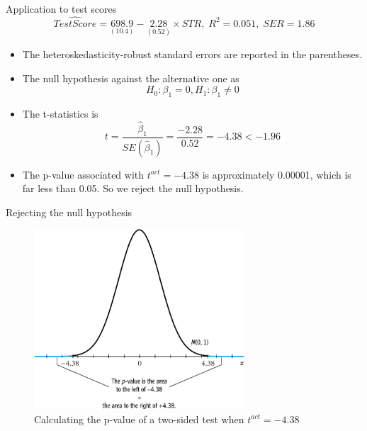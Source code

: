 \documentclass[presentation]{beamer}
\begin{document}
\begin{frame}[label={sec:org210bcff}]{Application to test scores}
\begin{equation*}
\widehat{TestScore} = \underset{\displaystyle (10.4)}{698.9} - \underset{\displaystyle (0.52)}{2.28} \times STR,\; R^2 = 0.051,\; SER = 1.86
\end{equation*}

\begin{itemize}
\item The \alert{heteroskedasticity-robust} standard errors are reported in the
parentheses.

\item The null hypothesis against the alternative one as
\[ H_0: \beta_1 = 0, H_1: \beta_1 \neq 0 \]

\item The t-statistics is
\[ t = \frac{\hat{\beta}_1}{SE(\hat{\beta}_1)} = \frac{-2.28}{0.52}
  = -4.38 < -1.96 \]

\item The p-value associated with \(t^{act} = -4.38\) is approximately
0.00001, which is far less than 0.05. So we reject the null
hypothesis.
\end{itemize}
\end{frame}

\begin{frame}[label={sec:org2299bf5}]{Rejecting the null hypothesis}
\begin{figure}[htbp]
\centering
\includegraphics[width=0.7\textwidth]{figure/fig-5-1.png}
\caption{\label{fig:org0cec173}
Calculating the p-value of a two-sided test when \(t^{act}=-4.38\)}
\end{figure}
\end{frame}
\end{document}
